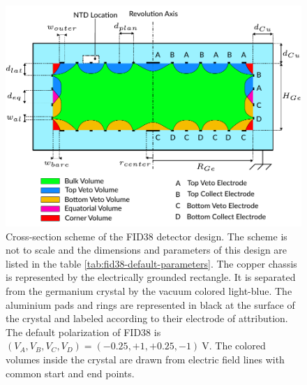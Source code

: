 \begin{figure}
\centering
\includegraphics[scale=1]{Figures/Electrodes/scheme_fid38.pdf}
\caption{
Cross-section scheme of the FID38 detector design. The scheme is not to scale and the dimensions and parameters of this design are listed in the table \ref{tab:fid38-default-parameters}. The copper chassis is represented by the electrically grounded rectangle. It is separated from the germanium crystal by the vacuum colored light-blue. The aluminium pads and rings are represented in black at the surface of the crystal and labeled according to their electrode of attribution. The default polarization of FID38 is $(V_A, V_B, V_C, V_D) = (-0.25, +1, +0.25,  -1) \ \si{\volt}$. The colored volumes inside the crystal are drawn from electric field lines with common start and end points.
}
\label{fig:fid38-scheme}
\end{figure}

